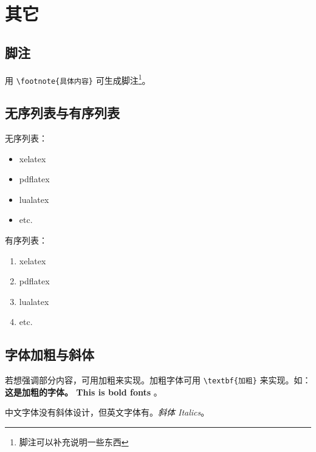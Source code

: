 \section{其它}

\subsection{脚注}

用 \verb|\footnote{具体内容}| 可生成脚注\footnote{脚注可以补充说明一些东西}。

\subsection{无序列表与有序列表}

无序列表：
\begin{itemize}
  \item xelatex
  \item pdflatex
  \item lualatex
  \item etc.
\end{itemize}

有序列表：
\begin{enumerate}
  \item xelatex
  \item pdflatex
  \item lualatex
  \item etc.
\end{enumerate}

\subsection{字体加粗与斜体}

若想强调部分内容，可用加粗来实现。加粗字体可用 \verb|\textbf{加粗}| 来实现。如： \textbf{这是加粗的字体。 This is bold fonts} 。

中文字体没有斜体设计，但英文字体有。\textit{斜体 Italics}。
